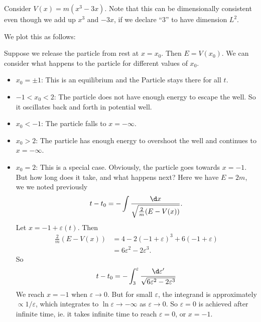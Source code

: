 \documentclass[a4paper]{article}
\begin{document}
\begin{eg}
  Consider $V(x) = m(x^3 - 3x)$. Note that this can be dimensionally consistent even though we add up $x^3$ and $-3x$, if we declare ``3'' to have dimension $L^2$.

  We plot this as follows:
  \begin{center}
  \end{center}
  Suppose we release the particle from rest at $x = x_0$. Then $E = V(x_0)$. We can consider what happens to the particle for different values of $x_0$.
  \begin{itemize}
    \item $x_0 = \pm 1$: This is an equilibrium and the Particle stays there for all $t$.
    \item $-1 < x_0 < 2$: The particle does not have enough energy to escape the well. So it oscillates back and forth in potential well.
    \item $x_0 < -1$: The particle falls to $x = -\infty$.
    \item $x_0 > 2$: The particle has enough energy to overshoot the well and continues to $x = -\infty$.
    \item $x_0 = 2$: This is a special case. Obviously, the particle goes towards $x = -1$. But how long does it take, and what happens next? Here we have $E = 2m$, we we noted previously
      \[
        t - t_0 = -\int \frac{\d x}{\sqrt{\frac{2}{m}(E - V(x))}}.
      \]
      Let $x = -1 + \varepsilon(t)$. Then
      \begin{align*}
        \frac{2}{m}(E-V(x)) &= 4 - 2(-1 + \varepsilon)^3 + 6(-1 + \varepsilon)\\
        &= 6\varepsilon^2 - 2\varepsilon^3.
      \end{align*}
      So
      \[
        t - t_0 = -\int_3^\varepsilon \frac{\d \varepsilon'}{\sqrt{6\varepsilon^2 - 2\varepsilon^3}}
      \]
      We reach $x = -1$ when $\varepsilon \to 0$. But for small $\varepsilon$, the integrand is approximately $\propto 1/\varepsilon$, which integrates to $\ln \varepsilon \to -\infty$ as $\varepsilon \to 0$. So $\varepsilon = 0$ is achieved after infinite time, ie. it takes infinite time to reach $\varepsilon = 0$, or $x = -1$.
  \end{itemize}
\end{eg}
\end{document}
